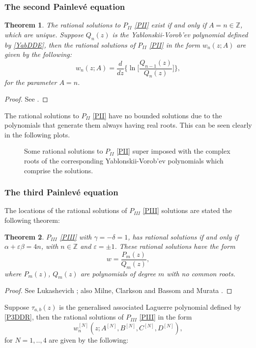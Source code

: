 \documentclass[12pt]{article}
\def\P{Painlev\'e }
\def\Z{\mathbb{Z}}
\newtheorem{mydef}{Theorem}[section]
\numberwithin{figure}{section}
\numberwithin{equation}{section}
\numberwithin{table}{section}
\begin{document}
\subsubsection{The second \P equation}
\begin{mydef}
The rational solutions to $P_{II}$ \eqref{PII} exist if and only if $A=n\in\Z$, which are unique.
Suppose $Q_n(z)$ is the Yablonskii-Vorob'ev polynomial defined by \eqref{YabDDE}, then the rational solutions of $P_{II}$ \eqref{PII} in the form $w_n(z;A)$ are given by the following:
\begin{equation}
w_n(z;A)=\frac{d}{dz}\bigg\{\ln\bigg[\frac{Q_{n-1}(z)}{Q_n(z)}\bigg]\bigg\},
\end{equation}
for the parameter $A=n$.
\end{mydef}
\begin{proof}
See \cite{P:1:59,P:3:35,P:159:200,P:159:111}.
\end{proof}
The rational solutions to $P_{II}$ \eqref{PII} have no bounded solutions due to the polynomials that generate them always having real roots. This can be seen clearly in the following plots.
\begin{figure}[H]
\centering
{}
\caption{Some rational solutions to $P_{II}$ \eqref{PII} super imposed with the complex roots of the corresponding Yablonskii-Vorob'ev polynomials which comprise the solutions.}
\end{figure}
\subsubsection{The third \P equation}
The locations of the rational solutions of $P_{III}$ \eqref{PIII} solutions are stated the following theorem:
\begin{mydef}
$P_{III}$ \eqref{PIII} with $\gamma=-\delta=1$, has rational solutions if and only if $\alpha+\varepsilon\beta=4n$, with $n\in\Z$ and $\varepsilon=\pm1$. These rational solutions have the form $$w=\frac{P_m(z)}{Q_m(z)},$$
where $P_m(z)$, $Q_m(z)$ are polynomials of degree $m$ with no common roots.
\end{mydef}
\begin{proof}
See Lukashevich \cite{P:3:999}; also Milne, Clarkson and Bassom \cite{P:98:194} and Murata \cite{P:139:65}.
\end{proof}
Suppose $\tau_{a,b}(z)$ is the generalised associated Laguerre polynomial defined by \eqref{P3DDR}, then the rational solutions of $P_{III}$ \eqref{PIII} in the form $$w^{[N]}_n(z;A^{[N]},B^{[N]},C^{[N]},D^{[N]}),$$ for $N=1,..,4$ are given by the following:
\end{document}
